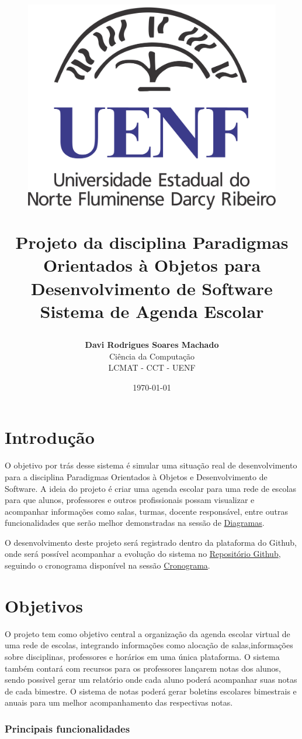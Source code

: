 \documentclass[12pt,a4paper]{report}
\title{
	\begin{figure}
	\centering
	\includegraphics[scale=0.3]{imagens/uenf1.png}
	\end{figure}
    \vspace{1cm}
    \Huge \textbf{Projeto da disciplina Paradigmas Orientados à Objetos para Desenvolvimento de Software} \\[0.5cm]
    \Large Sistema de Agenda Escolar
    \vspace{2cm}
}
\author{\textbf{Davi Rodrigues Soares Machado} \\ Ciência da Computação \\ LCMAT - CCT - UENF}
\date{\today}
\begin{document}
\maketitle
\newpage

\tableofcontents
\newpage






\chapter{Introdução}
O objetivo por trás desse sistema é simular uma situação real de desenvolvimento para a disciplina Paradigmas Orientados à Objetos e Desenvolvimento de Software. A ideia do projeto é criar uma agenda escolar para uma rede de escolas para que alunos, professores e outros profissionais possam visualizar e acompanhar informações como salas, turmas, docente responsável, entre outras funcionalidades que serão melhor demonstradas na sessão de \hyperref[sec:DCU]{Diagramas}. 


O desenvolvimento deste projeto será registrado dentro da plataforma do Github, onde será possível acompanhar a evolução do sistema no \href{https://github.com/DaviRodrish/Projeto-PooDev---Agenda-Escolar}{Repositório Github}, seguindo o cronograma disponível na sessão \hyperref[sec:cronograma]{Cronograma}.




\chapter{Objetivos}
O projeto tem como objetivo central a organização da agenda escolar virtual de uma rede de escolas, integrando informações como alocação de salas,informações sobre disciplinas, professores e horários em uma única plataforma. O sistema também contará com recursos para os professores lançarem notas dos alunos, sendo possivel gerar um relatório onde cada aluno poderá acompanhar suas notas de cada bimestre. O sistema de notas poderá gerar boletins escolares bimestrais e anuais para um melhor acompanhamento das respectivas notas. 

\subsection*{Principais funcionalidades}
\end{document}
